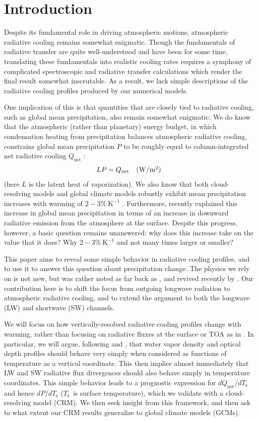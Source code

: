 \documentclass[10pt]{article}
\newcommand{\beqn}{\begin{equation}}
\newcommand{\eeqn}{\end{equation}}
\newcommand{\Qnet}{\ensuremath{Q_\mathrm{net}}}
\newcommand{\Wmsq}{\ensuremath{\mathrm{W/m^2}}}
\newcommand{\Ts}{\ensuremath{T_\mathrm{s}}}
\newcommand{\Kinverse}{\ensuremath{\mathrm{K^{-1}}}}
\begin{document}
\section {Introduction}
Despite its fundamental role in driving atmospheric motions, atmospheric radiative cooling remains somewhat enigmatic. Though the fundamentals of radiative transfer are quite well-understood and have been for some time, translating these fundamentals into realistic cooling rates requires a symphony of complicated spectroscopic and radiative transfer calculations which render the final result somewhat inscrutable. As a result, we lack simple descriptions of the radiative cooling profiles produced by our numerical models.

One implication of this is that quantities that are closely tied to radiative cooling, such as global mean precipitation, also remain somewhat enigmatic. We do know that the atmospheric (rather than planetary) energy budget, in which condensation heating from precipitation balances atmospheric radiative cooling, constrains global mean precipitation $P$ to be roughly equal to column-integrated net radiative cooling $\Qnet$ \citep{ogorman2012,allen2002}:
\beqn
	LP = \Qnet \quad \mbox{(\Wmsq)} \label{rad_precip_constraint}
\eeqn
(here $L$ is the latent heat of vaporization). We also know that both cloud-resolving models and global climate models robustly exhibit  mean precipitation increases with warming of $2 -3\%\ \Kinverse$  \citep{stephens2008a, lambert2008, held2006}. Furthermore, \cite{pendergrass2014} recently explained this increase in global mean precipitation in terms of an increase in downward radiative emission from the atmosphere at the surface. Despite this progress, however, a basic question remains unanswered: why does this increase take on the value that it does? Why $2 -3\%\ \Kinverse$ and not many times  larger or smaller?

This paper aims to reveal some simple behavior in radiative cooling profiles, and to use it to  answer this question about precipitation change. The physics we rely on is not new, but was rather noted as far back as \cite{simpson1928}, and revived recently by \cite{ingram2010}. Our contribution here is to shift the focus from outgoing longwave radiation to atmospheric radiative cooling, and to extend the argument to both the longwave (LW) and shortwave (SW) channels. 

We will  focus on how vertically-resolved radiative cooling profiles change with warming, rather than focusing on radiative fluxes at the surface or TOA as in \cite{pendergrass2014}. In particular, we will argue, following \cite{simpson1928} and \cite{ingram2010}, that water vapor density and optical depth profiles should behave very simply when considered as functions of temperature as a vertical coordinate. This then implies almost immediately that LW and SW radiative flux divergences should also behave simply in temperature coordinates. This simple behavior leads to a prognostic expression for $d\Qnet/d\Ts$ and hence $dP/d\Ts$ (\Ts\ is surface temperature), which we validate with a cloud-resolving model (CRM). We then seek insight from this framework, and then ask to what extent our CRM results generalize  to global climate models (GCMs).
\end{document}

